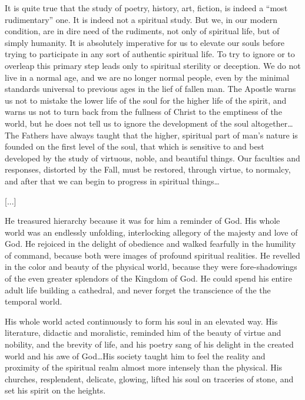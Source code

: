 It is quite true that the study of poetry, history, art, fiction, is indeed a “most rudimentary” one. It is indeed not a spiritual study. But we, in our modern condition, are in dire need of the rudiments, not only of spiritual life, but of simply humanity. It is absolutely imperative for us to elevate our souls before trying to participate in any sort of authentic spiritual life. To try to ignore or to overleap this primary step leads only to spiritual sterility or deception. We do not live in a normal age, and we are no longer normal people, even by the minimal standards universal to previous ages in the lief of fallen man. The Apostle warns us not to mistake the lower life of the soul for the higher life of the spirit, and warns us not to turn back from the fullness of Christ to the emptiness of the world, but he does not tell us to ignore the development of the soul altogether…The Fathers have always taught that the higher, spiritual part of man's nature is founded on the first level of the soul, that which is sensitive to and best developed by the study of virtuous, noble, and beautiful things. Our faculties and responses, distorted by the Fall, must be restored, through virtue, to normalcy, and after that we can begin to progress in spiritual things…

[...]

He treasured hierarchy because it was for him a reminder of God. His whole world was an endlessly unfolding, interlocking allegory of the majesty and love of God. He rejoiced in the delight of obedience and walked fearfully in the humility of command, because both were images of profound spiritual realities. He revelled in the color and beauty of the physical world, because they were fore-shadowings of the even greater splendors of the Kingdom of God. He could spend his entire adult life building a cathedral, and never forget the transcience of the the temporal world.

His whole world acted continuously to form his soul in an elevated way. His literature, didactic and moralistic, reminded him of the beauty of virtue and nobility, and the brevity of life, and his poetry sang of his delight in the created world and his awe of God…His society taught him to feel the reality and proximity of the spiritual realm almost more intensely than the physical. His churches, resplendent, delicate, glowing, lifted his soul on traceries of stone, and set his spirit on the heights.

